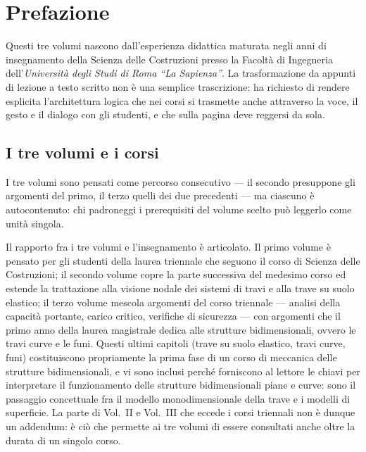\chapter*{Prefazione}

Questi tre volumi nascono dall'esperienza didattica maturata negli anni di insegnamento della Scienza delle Costruzioni
presso la Facoltà di Ingegneria dell'\textit{Uni\-versità degli	Studi di Roma ``La Sapienza''}. La trasformazione da appunti
di lezione a testo scritto non è una semplice trascrizione: ha richiesto di rendere esplicita l'architettura logica che
nei corsi si trasmette anche attraverso la voce, il gesto e il dialogo con gli studenti, e che sulla pagina deve reggersi
da sola.

\section*{I tre volumi e i corsi}

I tre volumi sono pensati come percorso consecutivo --- il
secondo presuppone gli argomenti del primo, il terzo quelli
dei due precedenti --- ma ciascuno è autocontenuto: chi
padroneggi i prerequisiti del volume scelto può leggerlo
come unità singola.

Il rapporto fra i tre volumi e l'insegnamento è articolato. Il
primo volume è pensato per gli studenti della laurea
triennale che seguono il corso di Scienza delle Costruzioni;
il secondo volume copre la parte successiva del medesimo
corso ed estende la trattazione alla visione nodale dei
sistemi di travi e alla trave su suolo elastico; il terzo
volume mescola argomenti del corso triennale --- analisi
della capacità portante, carico critico, verifiche di
sicurezza --- con argomenti che il primo anno della laurea
magistrale dedica alle strutture bidimensionali, ovvero le
travi curve e le funi. Questi ultimi capitoli (trave su
suolo elastico, travi curve, funi) costituiscono propriamente
la prima fase di un corso di meccanica delle strutture
bidimensionali, e vi sono inclusi perché forniscono al
lettore le chiavi per interpretare il funzionamento delle
strutture bidimensionali piane e curve: sono il passaggio
concettuale fra il modello monodimensionale della trave e i
modelli di superficie. La parte di Vol.~II e Vol.~III che
eccede i corsi triennali non è dunque un addendum: è ciò che
permette ai tre volumi di essere consultati anche oltre la
durata di un singolo corso.

